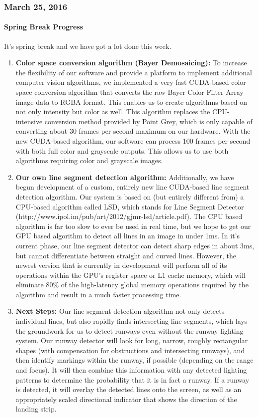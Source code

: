 \subsubsection{March 25, 2016}
\paragraph{Spring Break Progress}
It's spring break and we have got a lot done this week.

\begin{enumerate}[leftmargin=2cm,labelindent=2cm]
\item \textbf{Color space conversion algorithm (Bayer Demosaicing):} 
To increase the flexibility of our software and provide a platform to implement additional computer vision algorithms, we implemented a very fast CUDA-based color space conversion algorithm that converts the raw Bayer Color Filter Array image data to RGBA format. This enables us to create algorithms based on not only intensity but color as well. This algorithm replaces the CPU-intensive conversion method provided by Point Grey, which is only capable of converting about 30 frames per second maximum on our hardware. With the new CUDA-based algorithm, our software can process 100 frames per second with both full color and grayscale outputs. This allows us to use both algorithms requiring color and grayscale images.
\item \textbf{Our own line segment detection algorithm:} 
Additionally, we have begun development of a custom, entirely new line CUDA-based line segment detection algorithm. Our system is based on (but entirely different from) a CPU-based algorithm called LSD, which stands for Line Segment Detector (http://www.ipol.im/pub/art/2012/gjmr-lsd/article.pdf). The CPU based algorithm is far too slow to ever be used in real time, but we hope to get our GPU based algorithm to detect all lines in an image in under 1ms. In it's current phase, our line segment detector can detect sharp edges in about 3ms, but cannot differentiate between straight and curved lines. However, the newest version that is currently in development will perform all of its operations within the GPU's register space or L1 cache memory, which will eliminate 80\% of the high-latency global memory operations required by the algorithm and result in a much faster processing time.
\item \textbf{Next Steps:} 
Our line segment detection algorithm not only detects individual lines, but also rapidly finds intersecting line segments, which lays the groundwork for us to detect runways even without the runway lighting system. Our runway detector will look for long, narrow, roughly rectangular shapes (with compensation for obstructions and intersecting runways), and then identify markings within the runway, if possible (depending on the range and focus). It will then combine this information with any detected lighting patterns to determine the probability that it is in fact a runway. If a runway is detected, it will overlay the detected lines onto the screen, as well as an appropriately scaled directional indicator that shows the direction of the landing strip.

\end{enumerate}
